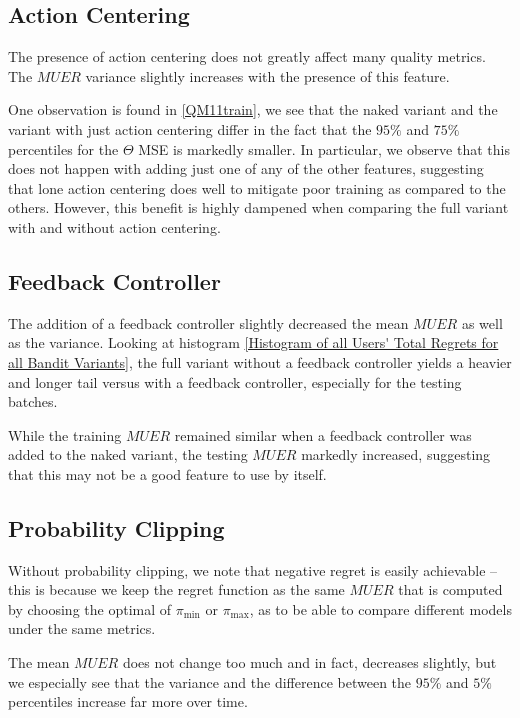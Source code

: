\clearpage

\subsection{Action Centering}

The presence of action centering does not greatly affect many quality metrics.  The $MUER$ variance slightly increases with the presence of this feature.

One observation is found in \ref{QM11train}, we see that the naked variant and the variant with just action centering differ in the fact that the $95\%$ and $75\%$ percentiles for the $\Theta$ MSE is markedly smaller.  In particular, we observe that this does not happen with adding just one of any of the other features, suggesting that lone action centering does well to mitigate poor training as compared to the others.  However, this benefit is highly dampened when comparing the full variant with and without action centering.


\subsection{Feedback Controller}

The addition of a feedback controller slightly decreased the mean $MUER$ as well as the variance.  Looking at histogram \ref{Histogram of all Users' Total Regrets for all Bandit Variants}, the full variant without a feedback controller yields a heavier and longer tail versus with a feedback controller, especially for the testing batches.

While the training $MUER$ remained similar when a feedback controller was added to the naked variant, the testing $MUER$ markedly increased, suggesting that this may not be a good feature to use by itself.

\subsection{Probability Clipping}

Without probability clipping, we note that negative regret is easily achievable -- this is because we keep the regret function as the same $MUER$ that is computed by choosing the optimal of $\pi_\text{min}$ or $\pi_\text{max}$, as to be able to compare different models under the same metrics.

The mean $MUER$ does not change too much and in fact, decreases slightly, but we especially see that the variance and the difference between the $95\%$ and $5\%$ percentiles increase far more over time. 

